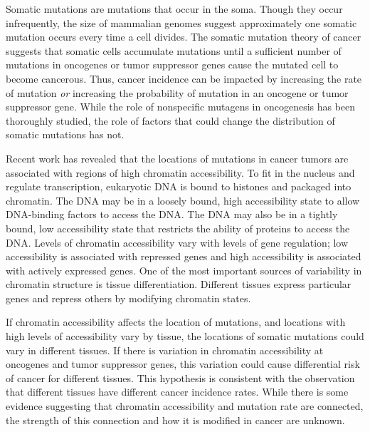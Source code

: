 
Somatic mutations are mutations that occur in the soma.
Though they occur infrequently, the size of mammalian genomes suggest approximately one somatic mutation occurs every time a cell divides.
The somatic mutation theory of cancer suggests that somatic cells accumulate mutations until a sufficient number of mutations in oncogenes or tumor suppressor genes cause the mutated cell to become cancerous.
Thus, cancer incidence can be impacted by increasing the rate of mutation \textit{or} increasing the probability of mutation in an oncogene or tumor suppressor gene.
While the role of nonspecific mutagens in oncogenesis has been thoroughly studied, the role of factors that could change the distribution of somatic mutations has not.

Recent work has revealed that the locations of mutations in cancer tumors are associated with regions of high chromatin accessibility.
To fit in the nucleus and regulate transcription, eukaryotic DNA is bound to histones and packaged into chromatin.
The DNA may be in a loosely bound, high accessibility state to allow DNA-binding factors to access the DNA.
The DNA may also be in a tightly bound, low accessibility state that restricts the ability of proteins to access the DNA.
Levels of chromatin accessibility vary with levels of gene regulation; low accessibility is associated with repressed genes and high accessibility is associated with actively expressed genes.
One of the most important sources of variability in chromatin structure is tissue differentiation.
Different tissues express particular genes and repress others by modifying chromatin states.

If chromatin accessibility affects the location of mutations, and locations with high levels of accessibility vary by tissue, the locations of somatic mutations could vary in different tissues.
If there is variation in chromatin accessibility at oncogenes and tumor suppressor genes, this variation could cause differential risk of cancer for different tissues.
This hypothesis is consistent with the observation that different tissues have different cancer incidence rates.
While there is some evidence suggesting that chromatin accessibility and mutation rate are connected, the strength of this connection and how it is modified in cancer are unknown.

